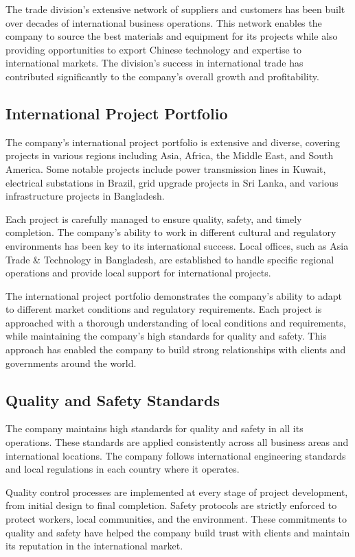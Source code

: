 The trade division's extensive network of suppliers and customers has been built over decades of international business operations. This network enables the company to source the best materials and equipment for its projects while also providing opportunities to export Chinese technology and expertise to international markets. The division's success in international trade has contributed significantly to the company's overall growth and profitability.

\subsection{International Project Portfolio}
The company's international project portfolio is extensive and diverse, covering projects in various regions including Asia, Africa, the Middle East, and South America. Some notable projects include power transmission lines in Kuwait, electrical substations in Brazil, grid upgrade projects in Sri Lanka, and various infrastructure projects in Bangladesh.

Each project is carefully managed to ensure quality, safety, and timely completion. The company's ability to work in different cultural and regulatory environments has been key to its international success. Local offices, such as Asia Trade \& Technology in Bangladesh, are established to handle specific regional operations and provide local support for international projects.

The international project portfolio demonstrates the company's ability to adapt to different market conditions and regulatory requirements. Each project is approached with a thorough understanding of local conditions and requirements, while maintaining the company's high standards for quality and safety. This approach has enabled the company to build strong relationships with clients and governments around the world.

\subsection{Quality and Safety Standards}
The company maintains high standards for quality and safety in all its operations. These standards are applied consistently across all business areas and international locations. The company follows international engineering standards and local regulations in each country where it operates.

Quality control processes are implemented at every stage of project development, from initial design to final completion. Safety protocols are strictly enforced to protect workers, local communities, and the environment. These commitments to quality and safety have helped the company build trust with clients and maintain its reputation in the international market.

